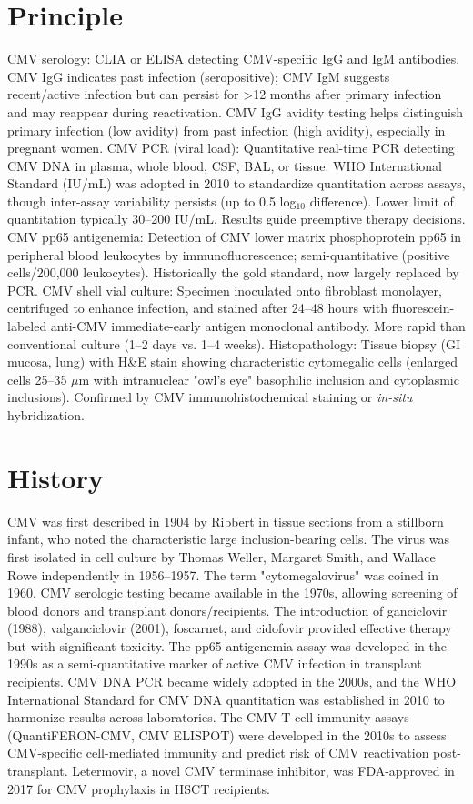 \section*{Principle}
CMV serology: CLIA or ELISA detecting CMV-specific IgG and IgM antibodies. CMV IgG indicates past infection (seropositive); CMV IgM suggests recent/active infection but can persist for >12 months after primary infection and may reappear during reactivation. CMV IgG avidity testing helps distinguish primary infection (low avidity) from past infection (high avidity), especially in pregnant women. CMV PCR (viral load): Quantitative real-time PCR detecting CMV DNA in plasma, whole blood, CSF, BAL, or tissue. WHO International Standard (IU/mL) was adopted in 2010 to standardize quantitation across assays, though inter-assay variability persists (up to 0.5 log$_{10}$ difference). Lower limit of quantitation typically 30--200 IU/mL. Results guide preemptive therapy decisions. CMV pp65 antigenemia: Detection of CMV lower matrix phosphoprotein pp65 in peripheral blood leukocytes by immunofluorescence; semi-quantitative (positive cells/200,000 leukocytes). Historically the gold standard, now largely replaced by PCR. CMV shell vial culture: Specimen inoculated onto fibroblast monolayer, centrifuged to enhance infection, and stained after 24--48 hours with fluorescein-labeled anti-CMV immediate-early antigen monoclonal antibody. More rapid than conventional culture (1--2 days vs. 1--4 weeks). Histopathology: Tissue biopsy (GI mucosa, lung) with H\&E stain showing characteristic cytomegalic cells (enlarged cells 25--35 $\mu$m with intranuclear "owl's eye" basophilic inclusion and cytoplasmic inclusions). Confirmed by CMV immunohistochemical staining or \textit{in-situ} hybridization.

\section*{History}
CMV was first described in 1904 by Ribbert in tissue sections from a stillborn infant, who noted the characteristic large inclusion-bearing cells. The virus was first isolated in cell culture by Thomas Weller, Margaret Smith, and Wallace Rowe independently in 1956--1957. The term "cytomegalovirus" was coined in 1960. CMV serologic testing became available in the 1970s, allowing screening of blood donors and transplant donors/recipients. The introduction of ganciclovir (1988), valganciclovir (2001), foscarnet, and cidofovir provided effective therapy but with significant toxicity. The pp65 antigenemia assay was developed in the 1990s as a semi-quantitative marker of active CMV infection in transplant recipients. CMV DNA PCR became widely adopted in the 2000s, and the WHO International Standard for CMV DNA quantitation was established in 2010 to harmonize results across laboratories. The CMV T-cell immunity assays (QuantiFERON-CMV, CMV ELISPOT) were developed in the 2010s to assess CMV-specific cell-mediated immunity and predict risk of CMV reactivation post-transplant. Letermovir, a novel CMV terminase inhibitor, was FDA-approved in 2017 for CMV prophylaxis in HSCT recipients.

